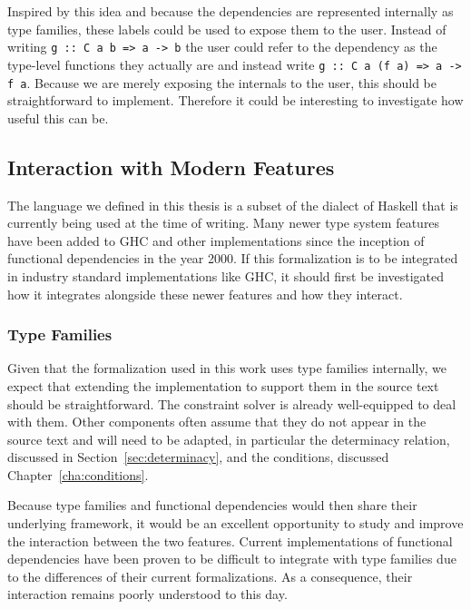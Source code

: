 Inspired by this idea and because the dependencies are represented internally as
type families, these labels could be used to expose them to the user. Instead of
writing \texttt{g :: C a b => a -> b} the user could refer to the dependency as
the type-level functions they actually are and instead write \texttt{g :: C a (f
a) => a -> f a}. Because we are merely exposing the internals to the user, this
should be straightforward to implement. Therefore it could be interesting to
investigate how useful this can be.

\subsection{Interaction with Modern Features}

The language we defined in this thesis is a subset of the dialect of Haskell
that is currently being used at the time of writing. Many newer type system
features have been added to GHC and other implementations since the inception of
functional dependencies in the year 2000. If this formalization is to be
integrated in industry standard implementations like GHC, it should first be
investigated how it integrates alongside these newer features and how they
interact.

\subsubsection{Type Families}

Given that the formalization used in this work uses type families internally, we
expect that extending the implementation to support them in the source text
should be straightforward. The constraint solver is already well-equipped to
deal with them. Other components often assume that they do not appear
in the source text and will need to be adapted, in particular the determinacy
relation, discussed in Section~\ref{sec:determinacy}, and the conditions,
discussed Chapter~\ref{cha:conditions}.

Because type families and functional dependencies would then share their
underlying framework, it would be an excellent opportunity to study and
improve the interaction between the two features. Current implementations of
functional dependencies have been proven to be difficult to integrate with type
families due to the differences of their current formalizations. As a consequence,
their interaction remains poorly understood to this day.

%
%
%

